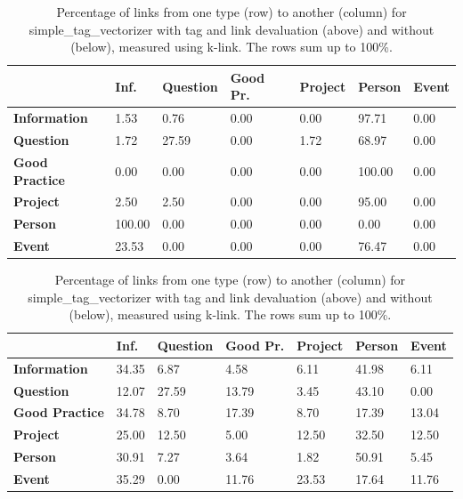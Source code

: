\begin{table}
\begin{tabular}{| l | l | l | l | l | l | l | }
\hline
 & {\bf Inf. }& {\bf Question }& {\bf Good Pr.} & {\bf Project }&{\bf Person }& {\bf Event}  \\
\hline
{\bf Information} & 1.53 &  0.76  &  0.00  &  0.00  & 97.71 & 0.00  \\
{\bf Question} & 1.72 &  27.59  &  0.00  &  1.72  & 68.97 & 0.00 \\
{\bf Good Practice} & 0.00 &  0.00  &  0.00  &  0.00  & 100.00 & 0.00 \\
{\bf Project }&2.50 &  2.50  &  0.00  &  0.00  & 95.00 & 0.00 \\
{\bf Person} & 100.00 &  0.00  &  0.00  &  0.00  & 0.00 & 0.00 \\
{\bf Event }& 23.53 &  0.00  &  0.00  &  0.00  & 76.47 & 0.00 \\
\hline
\end{tabular}

\hspace{10em}

\begin{tabular}{| l | l | l | l | l | l | l | }
\hline
 & {\bf Inf. }& {\bf Question }& {\bf Good Pr.} & {\bf Project }&{\bf Person }& {\bf Event} \\
\hline
{\bf Information} &  34.35 &6.87 &4.58 &6.11 &41.98 &6.11 \\
{\bf Question} & 12.07 & 27.59 & 13.79 & 3.45 & 43.10 & 0.00\\
{\bf Good Practice} & 34.78 &8.70 &17.39 &8.70 &17.39 &13.04\\
{\bf Project } & 25.00 &12.50 &5.00 &12.50 &32.50 &12.50 \\
{\bf Person} & 30.91 &7.27 &3.64 &1.82 &50.91 &5.45 \\
{\bf Event }& 35.29 & 0.00 & 11.76 & 23.53 & 17.64 & 11.76\\
\hline
\end{tabular}

\caption{Percentage of links from one type (row) to another (column) for simple\_tag\_vectorizer with tag and link devaluation (above) and without (below), measured using k-link. The rows sum up to 100\%.}
\label{bayes_table2}
\end{table}

